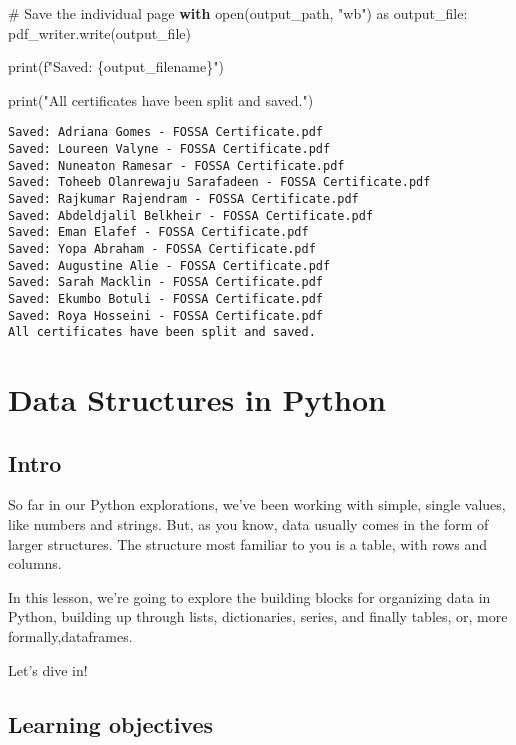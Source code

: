 \documentclass[
  letterpaper,
  DIV=11,
  numbers=noendperiod]{scrreprt}
\newenvironment{Shaded}{\begin{snugshade}}{\end{snugshade}}
\newcommand{\BuiltInTok}[1]{\textcolor[rgb]{0.00,0.23,0.31}{#1}}
\newcommand{\CommentTok}[1]{\textcolor[rgb]{0.37,0.37,0.37}{#1}}
\newcommand{\ControlFlowTok}[1]{\textcolor[rgb]{0.00,0.23,0.31}{\textbf{#1}}}
\newcommand{\ImportTok}[1]{\textcolor[rgb]{0.00,0.46,0.62}{#1}}
\newcommand{\NormalTok}[1]{\textcolor[rgb]{0.00,0.23,0.31}{#1}}
\newcommand{\SpecialCharTok}[1]{\textcolor[rgb]{0.37,0.37,0.37}{#1}}
\newcommand{\SpecialStringTok}[1]{\textcolor[rgb]{0.13,0.47,0.30}{#1}}
\newcommand{\StringTok}[1]{\textcolor[rgb]{0.13,0.47,0.30}{#1}}
\begin{document}
\begin{Shaded}
\begin{Highlighting}[]
    \CommentTok{\# Save the individual page}
    \ControlFlowTok{with} \BuiltInTok{open}\NormalTok{(output\_path, }\StringTok{"wb"}\NormalTok{) }\ImportTok{as}\NormalTok{ output\_file:}
\NormalTok{        pdf\_writer.write(output\_file)}
    
    \BuiltInTok{print}\NormalTok{(}\SpecialStringTok{f"Saved: }\SpecialCharTok{\{}\NormalTok{output\_filename}\SpecialCharTok{\}}\SpecialStringTok{"}\NormalTok{)}

\BuiltInTok{print}\NormalTok{(}\StringTok{"All certificates have been split and saved."}\NormalTok{)}
\end{Highlighting}
\end{Shaded}

\begin{verbatim}
Saved: Adriana Gomes - FOSSA Certificate.pdf
Saved: Loureen Valyne - FOSSA Certificate.pdf
Saved: Nuneaton Ramesar - FOSSA Certificate.pdf
Saved: Toheeb Olanrewaju Sarafadeen - FOSSA Certificate.pdf
Saved: Rajkumar Rajendram - FOSSA Certificate.pdf
Saved: Abdeldjalil Belkheir - FOSSA Certificate.pdf
Saved: Eman Elafef - FOSSA Certificate.pdf
Saved: Yopa Abraham - FOSSA Certificate.pdf
Saved: Augustine Alie - FOSSA Certificate.pdf
Saved: Sarah Macklin - FOSSA Certificate.pdf
Saved: Ekumbo Botuli - FOSSA Certificate.pdf
Saved: Roya Hosseini - FOSSA Certificate.pdf
All certificates have been split and saved.
\end{verbatim}

\chapter{Data Structures in Python}\label{data-structures-in-python}

\section{Intro}\label{intro}

So far in our Python explorations, we've been working with simple,
single values, like numbers and strings. But, as you know, data usually
comes in the form of larger structures. The structure most familiar to
you is a table, with rows and columns.

In this lesson, we're going to explore the building blocks for
organizing data in Python, building up through lists, dictionaries,
series, and finally tables, or, more formally,dataframes.

Let's dive in!

\section{Learning objectives}\label{learning-objectives-3}
\end{document}
